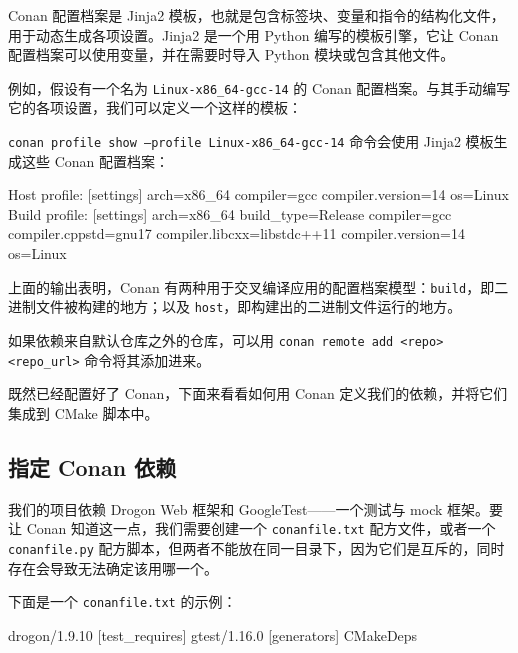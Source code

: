 Conan 配置档案是 Jinja2 模板，也就是包含标签块、变量和指令的结构化文件，用于动态生成各项设置。Jinja2 是一个用 Python 编写的模板引擎，它让 Conan 配置档案可以使用变量，并在需要时导入 Python 模块或包含其他文件。

\label{idx:727}
例如，假设有一个名为 \texttt{Linux-x86\_\allowbreak{}64-gcc-14} 的 Conan 配置档案。与其手动编写它的各项设置，我们可以定义一个这样的模板：


\texttt{conan profile show --profile Linux-x86\_\allowbreak{}64-gcc-14} 命令会使用 Jinja2 模板生成这些 Conan 配置档案：

\begin{codebox}[text]
Host profile:
[settings]
arch=x86_64
compiler=gcc
compiler.version=14
os=Linux
Build profile:
[settings]
arch=x86_64
build_type=Release
compiler=gcc
compiler.cppstd=gnu17
compiler.libcxx=libstdc++11
compiler.version=14
os=Linux
\end{codebox}

上面的输出表明，Conan 有两种用于交叉编译应用的配置档案模型：\texttt{build}，即二进制文件被构建的地方；以及 \texttt{host}，即构建出的二进制文件运行的地方。

\label{idx:728}
如果依赖来自默认仓库之外的仓库，可以用 \texttt{conan remote add <repo> <repo\_\allowbreak{}url>} 命令将其添加进来。

既然已经配置好了 Conan，下面来看看如何用 Conan 定义我们的依赖，并将它们集成到 CMake 脚本中。

\subsection{指定 Conan 依赖}

\label{idx:729}
我们的项目依赖 Drogon Web 框架和 GoogleTest——一个测试与 mock 框架。要让 Conan 知道这一点，我们需要创建一个 \texttt{conanfile.\allowbreak{}txt} 配方文件，或者一个 \texttt{conanfile.\allowbreak{}py} 配方脚本，但两者不能放在同一目录下，因为它们是互斥的，同时存在会导致无法确定该用哪一个。

下面是一个 \texttt{conanfile.\allowbreak{}txt} 的示例：

\begin{codebox}[text]
[requires]
drogon/1.9.10
[test_requires]
gtest/1.16.0
[generators]
CMakeDeps
\end{codebox}

